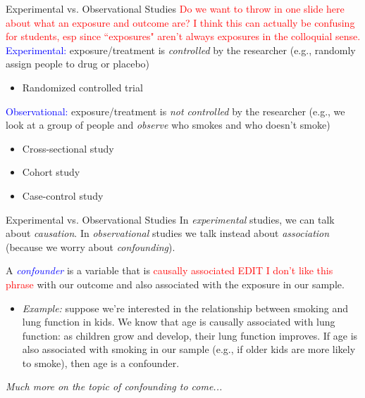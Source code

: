 \documentclass[10pt,t]{beamer}
\begin{document}
\begin{frame}{Experimental vs. Observational Studies}
\textcolor{red}{Do we want to throw in one slide here about what an exposure and outcome are? I think this can actually be confusing for students, esp since ``exposures" aren't always exposures in the colloquial sense.}
\textcolor{blue}{Experimental:} exposure/treatment is \textit{controlled} by the researcher (e.g., randomly assign people to drug or placebo)
\begin{itemize}
	\item Randomized controlled trial 
\end{itemize}

\vspace{0.3cm}

\textcolor{blue}{Observational:} exposure/treatment is \textit{not controlled} by the researcher (e.g., we look at a group of people and \textit{observe} who smokes and who doesn't smoke)
\begin{itemize}
	\item Cross-sectional study
	\item Cohort study
	\item Case-control study
\end{itemize}
\end{frame}
	
	
\begin{frame}{Experimental vs. Observational Studies}
In \textit{experimental} studies, we can talk about \color{blue} \textit{causation}\color{black}. In \textit{observational} studies we  talk instead about \color{blue} \textit{association} \color{black}(because we worry about \color{blue} \textit{confounding}\color{black}). \\

\vspace{0.3cm}

A \textit{\textcolor{blue}{confounder}} is a variable that is \textcolor{red}{causally associated EDIT I don't like this phrase} with our outcome and also associated with the exposure in our sample.  \\

\vspace{0.3cm}

\begin{itemize}
	\item[] \textit{Example:} suppose we're interested in the relationship between smoking and lung function in kids. We know that age is causally associated with lung function: as children grow and develop, their lung function improves. If age is also associated with smoking in our sample (e.g., if older kids are more likely to smoke), then age is a confounder.
\end{itemize} 

\vspace{0.3cm}

\small \textit{Much more on the topic of confounding to come...} 
\end{frame}
\end{document}
